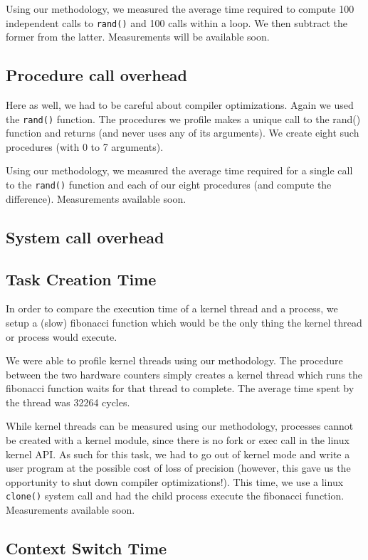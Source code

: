 Using our methodology, we measured the average time required to compute 100 independent calls to \texttt{rand()} and 100 calls within a loop. We then subtract the former from the latter. Measurements will be available soon.

\subsection{Procedure call overhead}

Here as well, we had to be careful about compiler optimizations. Again we used the \texttt{rand()} function. The procedures we profile makes a unique call to the rand() function and returns (and never uses any of its arguments). We create eight such procedures (with 0 to 7 arguments).

Using our methodology, we measured the average time required for a single call to the \texttt{rand()} function and each of our eight procedures (and compute the difference). Measurements available soon.

\subsection{System call overhead}

\subsection{Task Creation Time}

In order to compare the execution time of a kernel thread and a process, we setup a (slow) fibonacci function which would be the only thing the kernel thread or process would execute.

We were able to profile kernel threads using our methodology. The procedure between the two hardware counters simply creates a kernel thread which runs the fibonacci function waits for that thread to complete. The average time spent by the thread was 32264 cycles.

While kernel threads can be measured using our methodology, processes cannot be created with a kernel module, since there is no fork or exec call in the linux kernel API. As such for this task, we had to go out of kernel mode and write a user program at the possible cost of loss of precision (however, this gave us the opportunity to shut down compiler optimizations!). This time, we use a linux \texttt{clone()} system call and had the child process execute the fibonacci function. Measurements available soon.

\subsection{Context Switch Time}